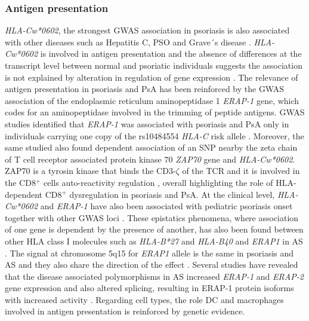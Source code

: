\subsubsection{Antigen presentation}
\textit{HLA-Cw*0602}, the strongest GWAS association in psoriasis is also associated with other diseases such as Hepatitis C, PSO and Grave´s disease \parencite{Blais2011}. \textit{HLA-Cw*0602} is involved in antigen presentation and the absence of differences at the transcript level between normal and psoriatic individuals suggests the association is not explained by alteration in regulation of gene expression \parencite{Hundhausen2012}. The relevance of antigen presentation in psoriasis and PsA has been reinforced by the GWAS association of the endoplasmic reticulum aminopeptidase 1 \textit{ERAP-1} gene, which codes for an aminopeptidase involved in the trimming of peptide antigens. GWAS studies identified that \textit{ERAP-1} was associated with psoriasis and PsA only in individuals carrying one copy of the rs10484554 \textit{HLA-C} risk allele \parencite{Strange2010}. Moreover, the same studied also found dependent association of an SNP nearby the zeta chain of T cell receptor associated protein kinase 70 \textit{ZAP70} gene and \textit{HLA-Cw*0602}. ZAP70 is a tyrosin kinase that binds the CD3-$\zeta$ of the TCR and it is involved in the CD8$^+$ cells auto-reactivity regulation \parencite{Picard2009}, overall highlighting the role of HLA-dependent CD8$^+$ dysregulation in psoriasis and PsA. At the clinical level, \textit{HLA-Cw*0602} and \textit{ERAP-1} have also been associated with pediatric psoriasis onset together with other GWAS loci \parencite{Bergboer2012}. These epistatics phenomena, where association of one gene is dependent by the presence of another, has also been found between other HLA class I molecules such as \textit{HLA-B*27} and \textit{HLA-B40} and \textit{ERAP1} in AS \parencite{Evans2011, Cortes2015b}. The signal at chromosome 5q15 for \textit{ERAP1} allele is the same in psoriasis and AS and they also share the direction of the effect \parencite{ImmunoBase}. Several studies have revealed that the disease associated polymorphisms in AS increased \textit{ERAP-1} and \textit{ERAP-2} gene expression and also altered splicing, resulting in ERAP-1 protein isoforms with increased activity \parencite{Constatino2015, Hanson2018}.
Regarding cell types, the role DC and macrophages involved in antigen presentation is reinforced by genetic evidence.

